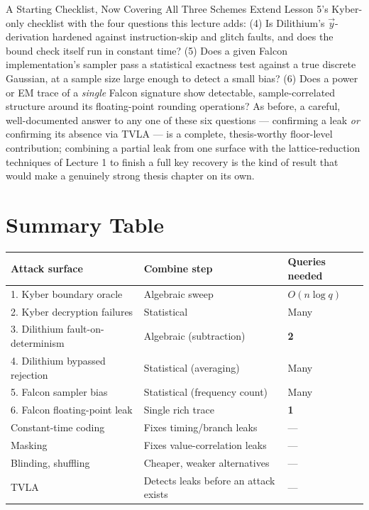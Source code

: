 \begin{previewbox}{A Starting Checklist, Now Covering All Three Schemes}
Extend Lesson 5's Kyber-only checklist with the four questions this lecture adds: (4) Is Dilithium's $\vec y$-derivation hardened against instruction-skip and glitch faults, and does the bound check itself run in constant time? (5) Does a given Falcon implementation's sampler pass a statistical exactness test against a true discrete Gaussian, at a sample size large enough to detect a small bias? (6) Does a power or EM trace of a \emph{single} Falcon signature show detectable, sample-correlated structure around its floating-point rounding operations? As before, a careful, well-documented answer to any one of these six questions --- confirming a leak \emph{or} confirming its absence via TVLA --- is a complete, thesis-worthy floor-level contribution; combining a partial leak from one surface with the lattice-reduction techniques of Lecture 1 to finish a full key recovery is the kind of result that would make a genuinely strong thesis chapter on its own.
\end{previewbox}

\section{Summary Table}
\label{sec:L6:summary-table}

\begin{center}
\renewcommand{\arraystretch}{1.3}
\begin{tabular}{|l|l|l|}
\hline
\textbf{Attack surface} & \textbf{Combine step} & \textbf{Queries needed} \\
\hline
1. Kyber boundary oracle & Algebraic sweep & $O(n\log q)$ \\
2. Kyber decryption failures & Statistical & Many \\
3. Dilithium fault-on-determinism & Algebraic (subtraction) & \textbf{2} \\
4. Dilithium bypassed rejection & Statistical (averaging) & Many \\
5. Falcon sampler bias & Statistical (frequency count) & Many \\
6. Falcon floating-point leak & Single rich trace & \textbf{1} \\
\hline
Constant-time coding & Fixes timing/branch leaks & --- \\
Masking & Fixes value-correlation leaks & --- \\
Blinding, shuffling & Cheaper, weaker alternatives & --- \\
TVLA & Detects leaks before an attack exists & --- \\
\hline
\end{tabular}
\end{center}

